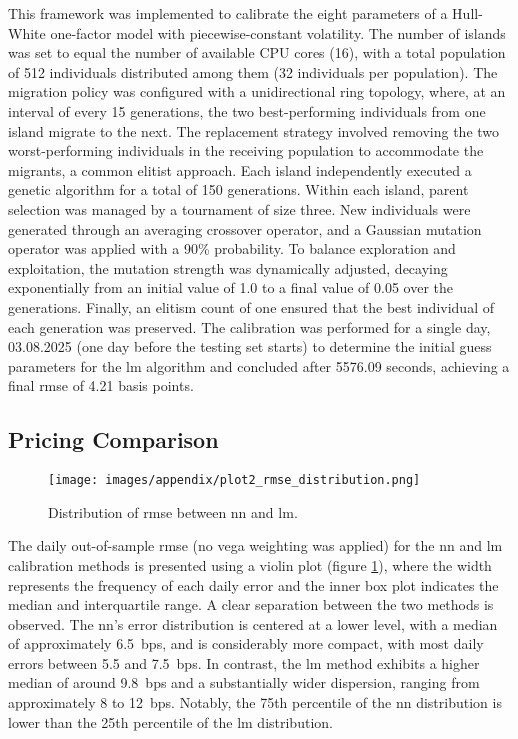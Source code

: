 This framework was implemented to calibrate the eight parameters of a Hull-White one-factor model with piecewise-constant volatility. The number of islands was set to equal the number of available CPU cores (16), with a total population of 512 individuals distributed among them (32 individuals per population). The migration policy was configured with a unidirectional ring topology, where, at an interval of every 15 generations, the two best-performing individuals from one island migrate to the next. The replacement strategy involved removing the two worst-performing individuals in the receiving population to accommodate the migrants, a common elitist approach. Each island independently executed a genetic algorithm for a total of 150 generations. Within each island, parent selection was managed by a tournament of size three. New individuals were generated through an averaging crossover operator, and a Gaussian mutation operator was applied with a 90\% probability. To balance exploration and exploitation, the mutation strength was dynamically adjusted, decaying exponentially from an initial value of 1.0 to a final value of 0.05 over the generations. Finally, an elitism count of one ensured that the best individual of each generation was preserved. The calibration was performed for a single day, 03.08.2025 (one day before the testing set starts) to determine the initial guess parameters for the \ac{lm} algorithm and concluded after 5576.09 seconds, achieving a final \ac{rmse} of 4.21 basis points.

\subsection{Pricing Comparison}
\begin{figure}[H]
	\centering
	\texttt{[image: images/appendix/plot2\_rmse\_distribution.png]}
	\caption{Distribution of \ac{rmse} between \ac{nn} and \ac{lm}.}
	\label{fig:distribution_rmse_violin plot}
\end{figure}
The daily out-of-sample \ac{rmse} (no vega weighting was applied) for the \ac{nn} and \ac{lm} calibration methods is presented using a violin plot (figure \ref{fig:distribution_rmse_violin plot}), where the width represents the frequency of each daily error and the inner box plot indicates the median and interquartile range. A clear separation between the two methods is observed. The \ac{nn}'s error distribution is centered at a lower level, with a median of approximately 6.5~\ac{bps}, and is considerably more compact, with most daily errors between 5.5 and 7.5~\ac{bps}. In contrast, the \ac{lm} method exhibits a higher median of around 9.8~\ac{bps} and a substantially wider dispersion, ranging from approximately 8 to 12~\ac{bps}. Notably, the 75th percentile of the \ac{nn} distribution is lower than the 25th percentile of the \ac{lm} distribution.

